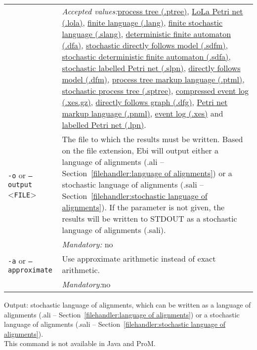 {\begin{tabularx}{\linewidth}{lX}
&\textit{Accepted values:}\quad \hyperref[filehandler:process tree]{process tree (.ptree)}, \hyperref[filehandler:LoLa Petri net]{LoLa Petri net (.lola)}, \hyperref[filehandler:finite language]{finite language (.lang)}, \hyperref[filehandler:finite stochastic language]{finite stochastic language (.slang)}, \hyperref[filehandler:deterministic finite automaton]{deterministic finite automaton (.dfa)}, \hyperref[filehandler:stochastic directly follows model]{stochastic directly follows model (.sdfm)}, \hyperref[filehandler:stochastic deterministic finite automaton]{stochastic deterministic finite automaton (.sdfa)}, \hyperref[filehandler:stochastic labelled Petri net]{stochastic labelled Petri net (.slpn)}, \hyperref[filehandler:directly follows model]{directly follows model (.dfm)}, \hyperref[filehandler:process tree markup language]{process tree markup language (.ptml)}, \hyperref[filehandler:stochastic process tree]{stochastic process tree (.sptree)}, \hyperref[filehandler:compressed event log]{compressed event log (.xes.gz)}, \hyperref[filehandler:directly follows graph]{directly follows graph (.dfg)}, \hyperref[filehandler:Petri net markup language]{Petri net markup language (.pnml)}, \hyperref[filehandler:event log]{event log (.xes)} and \hyperref[filehandler:labelled Petri net]{labelled Petri net (.lpn)}.\\
\texttt{-o} or \texttt{--output} <\texttt{FILE}> &
The file to which the results must be written. Based on the file extension, Ebi will output either a language of alignments (.ali -- Section~\ref{filehandler:language of alignments}) or a stochastic language of alignments (.sali -- Section~\ref{filehandler:stochastic language of alignments}).
If the parameter is not given, the results will be written to STDOUT as a stochastic language of alignments (.sali).\\
&\textit{Mandatory:} \quad no\\
\texttt{-a} or \texttt{--approximate} & Use approximate arithmetic instead of exact arithmetic.\\
&\textit{Mandatory:}\quad no\\
\bottomrule
\end{tabularx}
\noindent Output: stochastic language of alignments, which can be written as a language of alignments (.ali -- Section~\ref{filehandler:language of alignments}) or a stochastic language of alignments (.sali -- Section~\ref{filehandler:stochastic language of alignments}).
\\This command is not available in Java and ProM.
}
